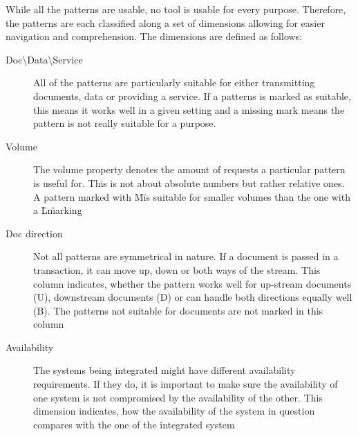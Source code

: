 \documentclass[10pt,a4paper]{article}
\begin{document}
While all the patterns are usable, no tool is usable for every purpose. Therefore, the patterns are each classified along a set of dimensions allowing for easier navigation and comprehension. The dimensions are defined as follows:
\begin{description}
	\item[Doc\textbackslash Data\textbackslash Service] All of the patterns are particularly suitable for either transmitting documents, data or providing a service. If a patterns is marked as suitable, this means it works well in a given setting and a missing mark means the pattern is not really suitable for a purpose. 
	\item[Volume] The volume property denotes the amount of requests a particular pattern is useful for. This is not about absolute numbers but rather relative ones. A pattern marked with \"M\" is suitable for smaller volumes than the one with a \"L\" marking
	\item[Doc direction] Not all patterns are symmetrical in nature. If a document is passed in a transaction, it can move up, down or both ways of the stream. This column indicates, whether the pattern works well for up-stream documents (U), downstream documents (D) or can handle both directions equally well (B). The patterns not suitable for documents are not marked in this column
	 \item[Availability] The systems being integrated might have different availability requirements. If they do, it is important to make sure the availability of one system is not compromised by the availability of the other. This dimension indicates, how the availability of the system in question compares with the one of the integrated system
\end{description}
\end{document}
